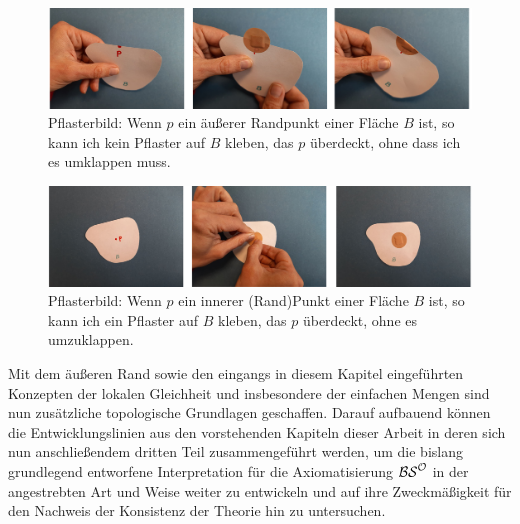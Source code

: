     \begin{figure}[ht]
        \centering
        \includegraphics[width=\textwidth]{abb/pflasterbild-aeusserer-rand.png}
        \caption[Pflasterbild: äußerer Randpunkt]{Pflasterbild: Wenn $p$ ein äußerer Randpunkt einer Fläche $B$ ist, so kann ich kein Pflaster auf $B$ kleben, das $p$ überdeckt, ohne dass ich es umklappen muss.}
        \label{fig:pflasterbild-aeusserer-rand}
    \end{figure}
    
    \begin{figure}[ht]
        \centering
        \includegraphics[width=\textwidth]{abb/pflasterbild-innerer-pkt.png}
        \caption[Pflasterbild: innerer Punkt]{Pflasterbild: Wenn $p$ ein innerer (Rand)Punkt einer Fläche $B$ ist, so kann ich ein Pflaster auf $B$ kleben, das $p$ überdeckt, ohne es umzuklappen.}
        \label{fig:pflasterbild-innerer-pkt}
    \end{figure}
    

\bigskip
{}
Mit dem äußeren Rand sowie den eingangs in diesem Kapitel eingeführten Konzepten der lokalen Gleichheit und insbesondere der einfachen Mengen sind nun zusätzliche topologische Grundlagen geschaffen. Darauf aufbauend können die Entwicklungslinien aus den vorstehenden Kapiteln dieser Arbeit in deren sich nun anschließendem dritten Teil zusammengeführt werden, um die bislang grundlegend entworfene Interpretation für die Axiomatisierung $\mathcal{BS}^{\mathcal{O}}$ in der angestrebten Art und Weise weiter zu entwickeln und auf ihre Zweckmäßigkeit für den Nachweis der Konsistenz der Theorie hin zu untersuchen.

